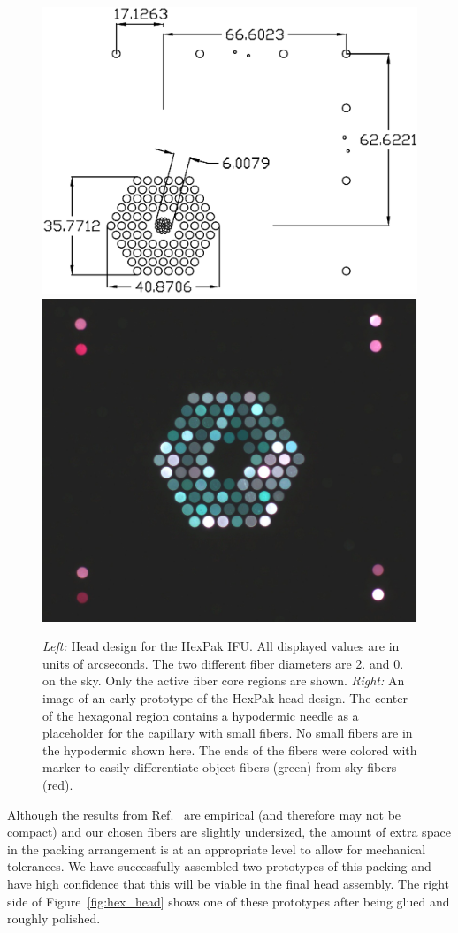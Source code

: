 \begin{figure}[t]
    \centering
    \includegraphics[width=.55\textwidth]{Pak_build/figs/hexpak}
    \hfill
    \includegraphics[width=.42\textwidth]{Pak_build/figs/hex_proto}
    \vspace{1.5mm}
    \caption[HexPak Design]{\fixspacing \emph{Left:} Head design for the
      HexPak IFU.  All displayed values are in units of arcseconds.  The two
      different fiber diameters are 2. and 0. on the sky.  Only
      the active fiber core regions are shown.  \emph{Right:} An image of an
      early prototype of the HexPak head design.  The center of the hexagonal
      region contains a hypodermic needle as a placeholder for the capillary
      with small fibers.  No small fibers are in the hypodermic shown here.
      The ends of the fibers were colored with marker to easily differentiate
      object fibers (green) from sky fibers (red).
    \label{fig:hexpak}}
\end{figure}


Although the results from Ref.~ are empirical (and
therefore may not be compact) and our chosen fibers are slightly undersized,
the amount of extra space in the packing arrangement is at an appropriate
level to allow for mechanical tolerances.  We have successfully assembled two
prototypes of this packing and have high confidence that this will be viable
in the final head assembly.  The right side of
Figure~\ref{fig:hex_head} shows one of these prototypes after being
glued and roughly polished.


